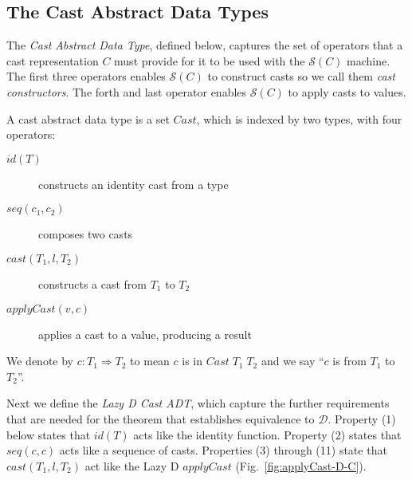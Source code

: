 \documentclass[acmsmall,review,anonymous]{acmart}\settopmatter{printfolios=true,printccs=false,printacmref=false}
\newcommand{\ineffCEKD}{$\mathcal{D}$}
\newcommand{\effCEK}[1]{$\mathcal{S}(#1)$}
\begin{document}
\subsection{The Cast Abstract Data Types}

The \emph{Cast Abstract Data Type}, defined below, captures the set of
operators that a cast representation $C$ must provide for it to be
used with the \effCEK{C} machine.  The first three operators enables
\effCEK{C} to construct casts so we call them \textit{cast
  constructors}. The forth and last operator enables \effCEK{C} to
apply casts to values.

\begin{definition}
  \label{def:cast-rep}
  A cast abstract data type is a set $Cast$, which is indexed by two types, 
  with four operators:
  \begin{description}
  \item[$id(T)$] constructs an identity cast from a type
  \item[$seq(c_1,c_2)$] composes two casts
  \item[$cast(T_1,l,T_2)$] constructs a cast from $T_1$ to $T_2$
  \item[$applyCast(v,c)$] applies a cast to a value, producing a result
  \end{description}
  We denote by $c : T_1 \Longrightarrow T_2$ to mean $c$ is in $Cast \; T_1 \; T_2$
  and we say ``$c$ is from $T_1$ to $T_2$''.
\end{definition}

Next we define the \emph{Lazy D Cast ADT}, which capture the further
requirements that are needed for the theorem that establishes
equivalence to \ineffCEKD{}. Property (1) below states that $id(T)$
acts like the identity function. Property (2) states that $seq(c,c)$
acts like a sequence of casts. Properties (3) through (11) state that
$cast(T_1,l,T_2)$ act like the Lazy D $applyCast$
(Fig.~\ref{fig:applyCast-D-C}).
\end{document}
